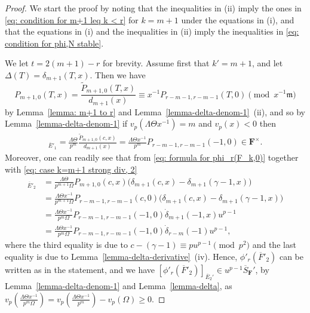 \documentclass[11pt]{amsart}
\theoremstyle{definition}
\numberwithin{equation}{subsection}
\theoremstyle{plain}
\theoremstyle{plain}
\theoremstyle{plain}
\theoremstyle{plain}
\theoremstyle{plain}
\theoremstyle{plain}
\theoremstyle{plain}
\theoremstyle{plain}
\theoremstyle{plain}
\theoremstyle{plain}
\theoremstyle{plain}
\theoremstyle{plain}
\theoremstyle{definition}
\theoremstyle{definition}
\theoremstyle{definition}
\theoremstyle{remark}
\renewcommand{\(}{\textup{(}}
\renewcommand{\)}{\textup{)}}
\newcommand{\F}{\mathbf{F}}
\newcommand{\barS}{\overline{S}}
\newcommand{\fm}{\mathfrak{m}}
\newcommand{\barE}{\overline{E}}
\newcommand{\barF}{\overline{F}}
\begin{document}
\begin{proof}
We start the proof by noting that the inequalities in (ii) imply the ones in \eqref{eq: condition for m+1 leq k < r} for $k=m+1$ under the equations in (i), and that the equations in (i) and the inequalities in (ii) imply the inequalities in \eqref{eq: condition for phi,N stable}.


We let $t=2(m+1)-r$ for brevity. Assume first that $k'=m+1$, and let $\Delta(T)=\delta_{m+1}(T,x)$. Then we have
\begin{equation}\label{eq: case k=m+1 strong div, 2}
P_{m+1,0}(T,x)=\frac{\tilde{P}_{m+1,0}(T,x)}{d_{m+1}(x)}\equiv x^{-1}P_{r-m-1,r-m-1}(T,0)\pmod{x^{-1}\fm}
\end{equation}
by Lemma~\ref{lemma: m+1 to r} and Lemma~\ref{lemma-delta-denom-1}~(ii), and so by Lemma~\ref{lemma-delta-denom-1} if $v_p(\Lambda\Theta x^{-1})=m$ and $v_p(x)<0$ then
\begin{align*}
[\phi'_r(\barF'_2)]_{\barE'_1}= \frac{ \Lambda \Theta}{p^{m}}\frac{\tilde{P}_{m+1,0}(c,x)}{d_{m+1}(x)} =\frac{ \Lambda \Theta x^{-1}}{p^{m}}P_{r-m-1,r-m-1}(-1,0)\in\F^{\times}.
\end{align*}
Moreover, one can readily see that from \eqref{eq: formula for phi_r(F_k,0)} together with \eqref{eq: case k=m+1 strong div, 2}
\begin{align*}
[\phi'_r(\barF'_2)]_{\barE'_2}&= \frac{\Lambda\Theta}{p^{m+1}\Omega} P_{m+1,0}(c,x)\big(\delta_{m+1}(c,x)-\delta_{m+1}(\gamma-1,x)\big)\\
&=\frac{\Lambda\Theta x^{-1}}{p^{m+1}\Omega} P_{r-m-1,r-m-1}(c,0)\big(\delta_{m+1}(c,x)-\delta_{m+1}(\gamma-1,x)\big)\\
&=\frac{\Lambda\Theta x^{-1}}{p^{m}\Omega} P_{r-m-1,r-m-1}(-1,0)\dot{\delta}_{m+1}(-1,x)u^{p-1}\\
&=\frac{\Lambda\Theta x^{-1}}{p^{m}\Omega} P_{r-m-1,r-m-1}(-1,0)\dot{\delta}_{r-m}(-1)u^{p-1},
\end{align*}
where the third equality is due to $c-(\gamma-1)\equiv pu^{p-1}\pmod{p^2}$ and the last equality is due to Lemma~\ref{lemma-delta-derivative}~(iv). Hence, $\phi'_r(\barF'_2)$ can be written as in the statement, and we have $[\phi'_r(\barF'_2)]_{\barE_2'}\in u^{p-1}\barS_\F'$, by Lemma~\ref{lemma-delta-denom-1} and Lemma~\ref{lemma-delta}, as $v_p(\frac{\Lambda\Theta x^{-1}}{p^m\Omega})=v_p(\frac{\Lambda\Theta x^{-1}}{p^m})-v_p(\Omega) \geq 0$.



\end{proof}
\end{document}
